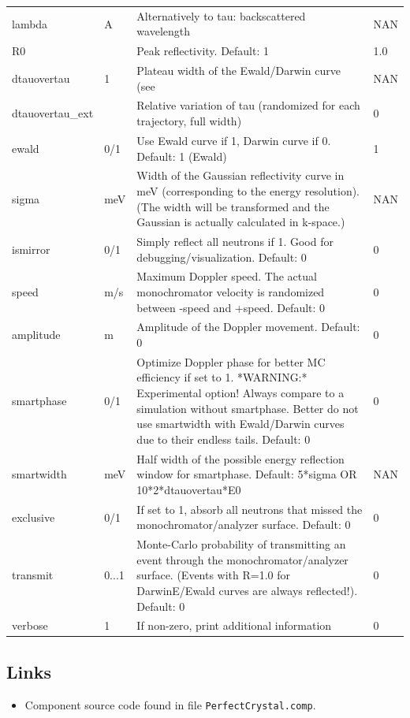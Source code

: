 \begin{longtable}{p{}p{}p{}p{}}
lambda & A & Alternatively to tau: backscattered wavelength & NAN \\
R0 &  & Peak reflectivity. Default: 1 & 1.0 \\
dtauovertau & 1 & Plateau width of the Ewald/Darwin curve (see & NAN \\
dtauovertau\_ext &  & Relative variation of tau (randomized for each trajectory, full width) & 0 \\
ewald & 0/1 & Use Ewald curve if 1, Darwin curve if 0. Default: 1 (Ewald) & 1 \\
sigma & meV & Width of the Gaussian reflectivity curve in meV (corresponding to the energy resolution). (The width will be transformed and the Gaussian is actually calculated in k-space.) & NAN \\
ismirror & 0/1 & Simply reflect all neutrons if 1. Good for debugging/visualization. Default: 0 & 0 \\
speed & m/s & Maximum Doppler speed. The actual monochromator velocity is randomized between -speed and +speed. Default: 0 & 0 \\
amplitude & m & Amplitude of the Doppler movement. Default: 0 & 0 \\
smartphase & 0/1 & Optimize Doppler phase for better MC efficiency if set to 1. *WARNING:* Experimental option! Always compare to a simulation without smartphase. Better do not use smartwidth with Ewald/Darwin curves due to their endless tails. Default: 0 & 0 \\
smartwidth & meV & Half width of the possible energy reflection window for smartphase. Default: 5*sigma OR 10*2*dtauovertau*E0 & NAN \\
exclusive & 0/1 & If set to 1, absorb all neutrons that missed the monochromator/analyzer surface. Default: 0 & 0 \\
transmit & 0...1 & Monte-Carlo probability of transmitting an event through the monochromator/analyzer surface. (Events with R=1.0 for DarwinE/Ewald curves are always reflected!). Default: 0 & 0 \\
verbose & 1 & If non-zero, print additional information & 0 \\
\bottomrule
\end{longtable}

\subsection*{Links}
\begin{itemize}
  \item Component source code found in file \texttt{PerfectCrystal.comp}.
\end{itemize}

